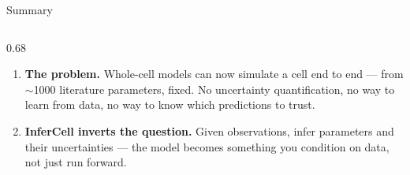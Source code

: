 \documentclass[aspectratio=169]{beamer}
\begin{document}
\begin{frame}{Summary}
	\begin{columns}[c,onlytextwidth]
		\begin{column}{0.68\textwidth}
			\small
			\begin{enumerate}\itemsep3pt
				\item \textbf{The problem.} Whole-cell models can now simulate a
				cell end to end --- from ${\sim}$1000 literature parameters,
				fixed. No uncertainty quantification, no way to learn from data,
				no way to know which predictions to trust.

				\item \textbf{InferCell inverts the question.} Given
				observations, infer parameters and their uncertainties --- the
				model becomes something you condition on data, not just run
				forward.


\end{enumerate}
\end{column}
\end{columns}
\end{frame}
\end{document}
